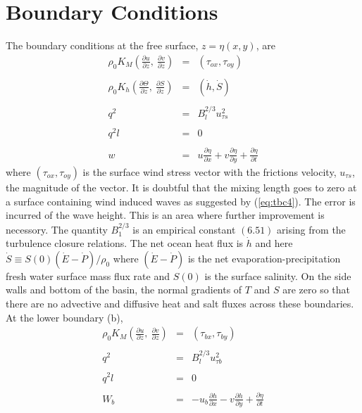\documentclass[oribibl]{llncs}
\begin{document}
\section{Boundary Conditions}

The boundary conditions at the free surface, $z=\eta(x,y)$, are
\begin{eqnarray}
\rho_0 K_M \left( \frac{\partial u}{\partial z},\  \frac{\partial v}{\partial z} \right) &=& (\tau_{ox}, \tau_{oy})  \label{eq:tbc1}\\ \nonumber \\ 
\rho_0 K_h \left( \frac{\partial \Theta }{\partial z},\  \frac{\partial S}{\partial z} \right) &=& (\dot{h}, \dot{S}) \label{eq:tbc2}\\ \nonumber \\ 
q^2 &=& B_l^{2/3} u_{\tau s}^2 \label{eq:tbc3}\\ \nonumber \\ 
q^2 l &=& 0  \label{eq:tbc4} \\ \nonumber \\ 
w   &=& u \frac{\partial \eta}{\partial x} + v \frac{\partial \eta}{\partial y} + \frac{\partial \eta}{\partial t} \label{eq:tbc5}
\end{eqnarray}
where $(\tau_{ox}, \tau_{oy})$ is the surface wind stress vector with the frictions velocity, $u_{\tau s}$, the magnitude of the vector. It is doubtful that the mixing length goes to zero at a surface containing wind induced waves as suggested by  (\ref{eq:tbc4}). The error is incurred of the wave height. This is an area where further improvement is necessory. The quantity $B_1^{2/3}$ is an empirical constant $(6.51)$ arising from the turbulence closure relations. The net ocean heat flux is $\dot{h}$ and here $\dot{S} \equiv S(0)(\dot{E}-\dot{P})/\rho_0$ where $(\dot{E}-\dot{P})$ is the net evaporation-precipitation fresh water surface mass flux rate and $S(0)$ is the surface salinity. On the side walls and bottom of the basin, the normal gradients of $T$ and $S$ are zero so that there are no advective and diffusive heat and salt fluxes across these boundaries. At the lower boundary (b),
\begin{eqnarray}
\rho_0 K_M \left( \frac{\partial u}{\partial z},\  \frac{\partial v}{\partial z} \right) &=& (\tau_{bx}, \tau_{by})  \label{eq:bbc1}\\ \nonumber \\ 
q^2 &=& B_l^{2/3} u_{\tau b}^2 \label{eq:bbc3}\\ \nonumber \\ 
q^2 l &=& 0  \label{eq:bbc4} \\ \nonumber \\ 
W_b   &=& -u_b \frac{\partial h}{\partial x} - v \frac{\partial h}{\partial y} + \frac{\partial \eta}{\partial t} \label{eq:bbc5}
\end{eqnarray}
\end{document}
